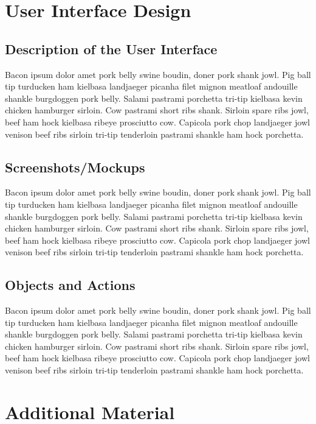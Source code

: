 \documentclass[12pt]{memoir}
\begin{document}
	\newpage
	\section{User Interface Design}
	\subsection{Description of the User Interface}
	Bacon ipsum dolor amet pork belly swine boudin, doner pork shank jowl. Pig ball tip turducken ham kielbasa landjaeger picanha filet mignon meatloaf andouille shankle burgdoggen pork belly. Salami pastrami porchetta tri-tip kielbasa kevin chicken hamburger sirloin. Cow pastrami short ribs shank. Sirloin spare ribs jowl, beef ham hock kielbasa ribeye prosciutto cow. Capicola pork chop landjaeger jowl venison beef ribs sirloin tri-tip tenderloin pastrami shankle ham hock porchetta.
	
	\subsection{Screenshots/Mockups}
	Bacon ipsum dolor amet pork belly swine boudin, doner pork shank jowl. Pig ball tip turducken ham kielbasa landjaeger picanha filet mignon meatloaf andouille shankle burgdoggen pork belly. Salami pastrami porchetta tri-tip kielbasa kevin chicken hamburger sirloin. Cow pastrami short ribs shank. Sirloin spare ribs jowl, beef ham hock kielbasa ribeye prosciutto cow. Capicola pork chop landjaeger jowl venison beef ribs sirloin tri-tip tenderloin pastrami shankle ham hock porchetta.
	
	\subsection{Objects and Actions}
	Bacon ipsum dolor amet pork belly swine boudin, doner pork shank jowl. Pig ball tip turducken ham kielbasa landjaeger picanha filet mignon meatloaf andouille shankle burgdoggen pork belly. Salami pastrami porchetta tri-tip kielbasa kevin chicken hamburger sirloin. Cow pastrami short ribs shank. Sirloin spare ribs jowl, beef ham hock kielbasa ribeye prosciutto cow. Capicola pork chop landjaeger jowl venison beef ribs sirloin tri-tip tenderloin pastrami shankle ham hock porchetta.

	\newpage
	\section{Additional Material}
\end{document}

